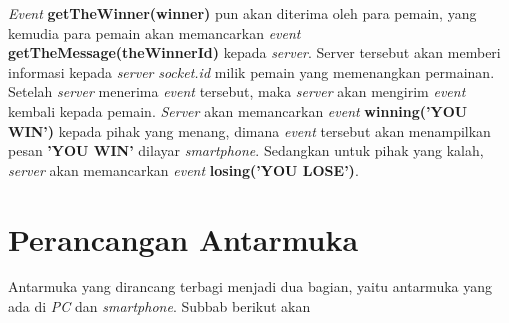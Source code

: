 \textit{Event} \textbf{getTheWinner(winner)} pun akan diterima oleh para pemain, yang kemudia para pemain akan memancarkan \textit{event} \textbf{getTheMessage(theWinnerId)} kepada \textit{server}. Server tersebut akan memberi informasi kepada \textit{server} \textit{socket.id} milik pemain yang memenangkan permainan. Setelah \textit{server} menerima \textit{event} tersebut, maka \textit{server} akan mengirim \textit{event} kembali kepada pemain. \textit{Server} akan memancarkan \textit{event} \textbf{winning('YOU WIN')} kepada pihak yang menang, dimana \textit{event} tersebut akan menampilkan pesan \textbf{'YOU WIN'} dilayar \textit{smartphone}. Sedangkan untuk pihak yang kalah, \textit{server} akan memancarkan \textit{event} \textbf{losing('YOU LOSE')}.

%


\section{Perancangan Antarmuka}
\label{sec:antarmuka}

Antarmuka yang dirancang terbagi menjadi dua bagian, yaitu antarmuka yang ada di \textit{PC} dan \textit{smartphone}. Subbab berikut akan 

